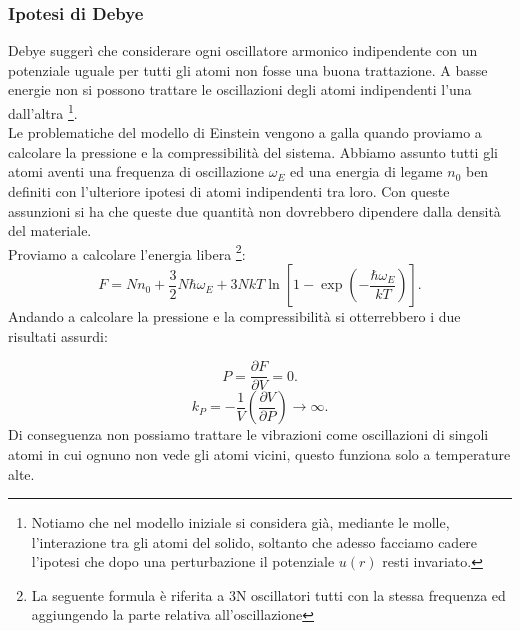 \subsubsection{Ipotesi di Debye}%
\label{subsub:Ipotesi di Debye}
Debye suggerì che considerare ogni oscillatore armonico indipendente con un potenziale uguale per tutti gli atomi non fosse una buona trattazione. A basse energie non si possono trattare le oscillazioni degli atomi indipendenti l'una dall'altra \footnote{Notiamo che nel modello iniziale si considera già, mediante le molle, l'interazione tra gli atomi del solido, soltanto che adesso facciamo cadere l'ipotesi che dopo una perturbazione il potenziale $u( r) $ resti invariato.}.\\
Le problematiche del modello di Einstein vengono a galla quando proviamo a calcolare la pressione e la compressibilità del sistema. Abbiamo assunto tutti gli atomi aventi una frequenza di oscillazione $\omega_{E}$ ed una energia di legame $n_0$ ben definiti con l'ulteriore ipotesi di atomi indipendenti tra loro. Con queste assunzioni si ha che queste due quantità non dovrebbero dipendere dalla densità del materiale. \\
Proviamo a calcolare l'energia libera \footnote{La seguente formula è riferita a 3N oscillatori tutti con la stessa frequenza ed aggiungendo la parte relativa all'oscillazione}:
\[
	F = N n_0 + \frac{3}{2}N\hbar \omega _{E} + 3 N kT\ln\left[ 1-\exp\left( -\frac{\hbar \omega _{E}}{kT} \right)  \right] 
.\] 
Andando a calcolare la pressione e la compressibilità si otterrebbero i due risultati assurdi:

\[
	P = \frac{\partial F}{\partial V} = 0
.\] 
\[
	k_P = - \frac{1}{V} \left( \frac{\partial V}{\partial P}  \right) \to \infty
.\] 
Di conseguenza non possiamo trattare le vibrazioni come oscillazioni di singoli atomi in cui ognuno non vede gli atomi vicini, questo funziona solo a temperature alte.
